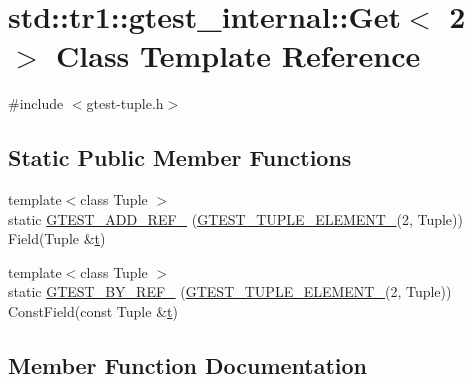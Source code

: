 \hypertarget{classstd_1_1tr1_1_1gtest__internal_1_1_get_3_012_01_4}{}\section{std\+::tr1\+::gtest\+\_\+internal\+::Get$<$ 2 $>$ Class Template Reference}
\label{classstd_1_1tr1_1_1gtest__internal_1_1_get_3_012_01_4}


{\ttfamily \#include $<$gtest-\/tuple.\+h$>$}

\subsection*{Static Public Member Functions}
\begin{DoxyCompactItemize}
\item 
{\footnotesize template$<$class Tuple $>$ }\\static \mbox{\hyperlink{classstd_1_1tr1_1_1gtest__internal_1_1_get_3_012_01_4_a8dfe7b5c1c915f10181e3fb5952ba6d8}{G\+T\+E\+S\+T\+\_\+\+A\+D\+D\+\_\+\+R\+E\+F\+\_\+}} (\mbox{\hyperlink{gtest-tuple_8h_a1b7f133d8aa02e0b7afed7b66781eeb7}{G\+T\+E\+S\+T\+\_\+\+T\+U\+P\+L\+E\+\_\+\+E\+L\+E\+M\+E\+N\+T\+\_\+}}(2, Tuple)) Field(Tuple \&\mbox{\hyperlink{_mutual_8h_a978d88b393c8a37dc2614c88788b3442}{t}})
\item 
{\footnotesize template$<$class Tuple $>$ }\\static \mbox{\hyperlink{classstd_1_1tr1_1_1gtest__internal_1_1_get_3_012_01_4_a76127c9c03c1f0caa61fb87d4d756b5b}{G\+T\+E\+S\+T\+\_\+\+B\+Y\+\_\+\+R\+E\+F\+\_\+}} (\mbox{\hyperlink{gtest-tuple_8h_a1b7f133d8aa02e0b7afed7b66781eeb7}{G\+T\+E\+S\+T\+\_\+\+T\+U\+P\+L\+E\+\_\+\+E\+L\+E\+M\+E\+N\+T\+\_\+}}(2, Tuple)) Const\+Field(const Tuple \&\mbox{\hyperlink{_mutual_8h_a978d88b393c8a37dc2614c88788b3442}{t}})
\end{DoxyCompactItemize}


\subsection{Member Function Documentation}
\mbox{\label{classstd_1_1tr1_1_1gtest__internal_1_1_get_3_012_01_4_a8dfe7b5c1c915f10181e3fb5952ba6d8}} 
